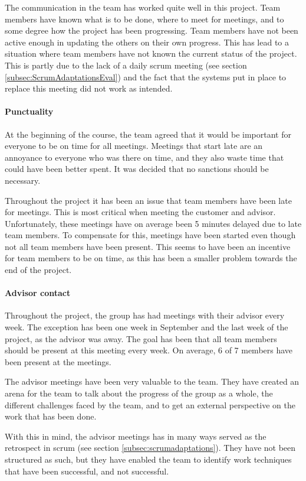 \documentclass[11pt,a4paper,titlepage,oneside]{report}
\begin{document}
The communication in the team has worked quite well in this project. Team members have known what is to be done, where to meet for meetings, and to some degree how the project has been progressing. Team members have not been active enough in updating the others on their own progress. This has lead to a situation where team members have not known the current status of the project. This is partly due to the lack of a daily scrum meeting (see section \ref{subsec:ScrumAdaptationsEval}) and the fact that the systems put in place to replace this meeting did not work as intended.

\paragraph{Punctuality}
At the beginning of the course, the team agreed that it would be important for everyone to be on time for all meetings. Meetings that start late are an annoyance to everyone who was there on time, and they also waste time that could have been better spent. It was decided that no sanctions should be necessary.

Throughout the project it has been an issue that team members have been late for meetings. This is most critical when meeting the customer and advisor. Unfortunately, these meetings have on average been 5 minutes delayed due to late team members. To compensate for this, meetings have been started even though not all team members have been present. This seems to have been an incentive for team members to be on time, as this has been a smaller problem towards the end of the project. 

\paragraph{Advisor contact}
Throughout the project, the group has had meetings with their advisor every week. The exception has been one week in September and the last week of the project, as the advisor was away. The goal has been that all team members should be present at this meeting every week. On average, 6 of 7 members have been present at the meetings.

The advisor meetings have been very valuable to the team. They have created an arena for the team to talk about the progress of the group as a whole, the different challenges faced by the team, and to get an external perspective on the work that has been done. 

With this in mind, the advisor meetings has in many ways served as the retrospect in scrum (see section \ref{subsec:scrumadaptations}). They have not been structured as such, but they have enabled the team to identify work techniques that have been successful, and not successful. 
\end{document}
